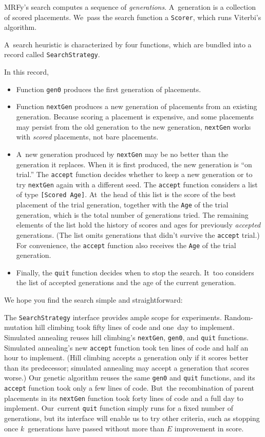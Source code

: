 \documentclass[preprint,nonatbib,blockstyle,nocopyrightspace,times]{sigplanconf}
\newcommand\seclabel[1]{\label{sec:#1}}
\newcommand\smallverbatiminput[1]{{\par\unskip\small}}
\newcommand\smallfuzzverbatiminput[2]{{\par\unskip\small\hfuzz=#1 }}
\begin{document}
MRFy's search computes a sequence of \emph{generations}.
A~generation is a collection of scored {placements}.
We~pass the
search function a \texttt{Scorer}, which runs Viterbi's algorithm.
\smallverbatiminput{scoredecl}
A~search heuristic is characterized by four functions, which are
bundled into a record called \texttt{SearchStrategy}.
\smallfuzzverbatiminput{2.3pt}{strategy}
In this record,
\begin{itemize}
\item
Function \texttt{gen0} produces the first generation of placements.
\item
Function \texttt{nextGen} produces a new generation of placements from
an existing generation.
Because scoring a placement is expensive, 
and some placements may persist from the old generation to the new
generation, \texttt{nextGen} works with \emph{scored} placements, not
bare placements.
\item
A~new generation produced by \texttt{nextGen} may be no better
than the generation it replaces.
When it is first produced, the new generation is ``on trial.''
The \texttt{accept} function decides whether to keep a new generation
or to try \texttt{nextGen} again with a different seed.
The \texttt{accept} function considers a list of type
\texttt{[Scored~Age]}.
At~the head of this list is the score of the best
placement of the trial generation, together with the \texttt{Age} of the trial
generation, which is the total number of generations tried.
The remaining elements of the list hold the history of scores and ages for
previously \emph{accepted} generations.
(The list omits generations that didn't survive the \texttt{accept} trial.)
For convenience, the \texttt{accept} function also receives
the \texttt{Age} of the trial generation.
\item
Finally, the \texttt{quit} function decides when to stop the search.
\ifnotcutting
It~too considers the list of accepted generations and the age of the current
generation. 
\fi
\end{itemize}
\seclabel{search}%
We hope you find the search simple and straightforward:
\smallfuzzverbatiminput{11pt}{search}

The \texttt{SearchStrategy} interface provides ample scope for
experiments. 
Random-mutation hill climbing took fifty lines of code and one~day to
implement.
Simulated annealing reuses hill climbing's
 \texttt{nextGen}, \texttt{gen0}, and \texttt{quit} functions.
Simulated annealing's  new \texttt{accept} function took ten
lines of code and half an hour to implement.
(Hill climbing accepts a generation only if it scores better than its
predecessor;
simulated annealing may accept a generation that scores worse.)
Our genetic algorithm reuses the same
\texttt{gen0} and \texttt{quit} functions, and its \texttt{accept}
function took only a few lines of code.
But~the recombination of parent
placements in its \texttt{nextGen} function took forty lines of code
and a full day to implement.
\ifnotcutting
Our~current \texttt{quit} function simply runs for a fixed number of
generations, but its interface will enable us to try other criteria,
such as stopping once $k$~generations have passed without more than $E$
improvement in score. 
\fi
\end{document}
